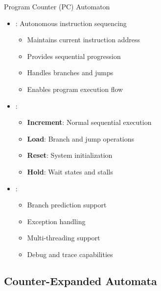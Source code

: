 \begin{frame}{Program Counter (PC) Automaton}
\begin{itemize}
\item {}: Autonomous instruction sequencing
\begin{itemize}
\item Maintains current instruction address
\item Provides sequential progression
\item Handles branches and jumps
\item Enables program execution flow
\end{itemize}
\vspace{0.5cm}
\item {}:
\begin{itemize}
\item \textbf{Increment}: Normal sequential execution
\item \textbf{Load}: Branch and jump operations
\item \textbf{Reset}: System initialization
\item \textbf{Hold}: Wait states and stalls
\end{itemize}
\vspace{0.3cm}
\item {}:
\begin{itemize}
\item Branch prediction support
\item Exception handling
\item Multi-threading support
\item Debug and trace capabilities
\end{itemize}
\end{itemize}
\end{frame}

\subsection{Counter-Expanded Automata}

